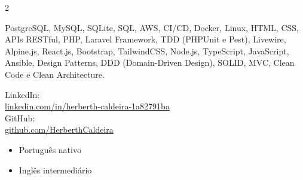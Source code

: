 \documentclass[10pt]{article}
\begin{document}
\begin{paracol}{2}

\switchcolumn

\small

PostgreSQL, MySQL, SQLite, SQL, AWS, CI/CD, Docker, Linux, HTML, CSS, APIs RESTful, PHP, Laravel Framework, TDD (PHPUnit e Pest), Livewire, Alpine.js, React.js, Bootstrap, TailwindCSS, Node.js, TypeScript, JavaScript, Ansible, Design Patterns, DDD (Domain-Driven Design), SOLID, MVC, Clean Code e Clean Architecture.

LinkedIn:\\
\href{https://www.linkedin.com/in/herberth-caldeira-1a82791ba}{linkedin.com/in/herberth-caldeira-1a82791ba}\\[6pt]
GitHub:\\
\href{https://github.com/HerberthCaldeira}{github.com/HerberthCaldeira}

\begin{itemize}
  \item Português nativo
  \item Inglês intermediário
\end{itemize}

\end{paracol}
\end{document}
